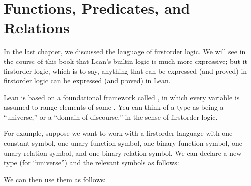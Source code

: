 \documentclass[letterpaper,10pt,english]{sphinxmanual}
\begin{document}
\section{Functions, Predicates, and Relations}
\label{\detokenize{first_order_logic_in_lean:functions-predicates-and-relations}}
\sphinxAtStartPar
In the last chapter, we discussed the language of first\sphinxhyphen{}order logic. We will see in the course of this book that Lean’s built\sphinxhyphen{}in logic is much more expressive; but it  first\sphinxhyphen{}order logic, which is to say, anything that can be expressed (and proved) in first\sphinxhyphen{}order logic can be expressed (and proved) in Lean.

\sphinxAtStartPar
Lean is based on a foundational framework called , in which every variable is assumed to range elements of some . You can think of a type as being a “universe,” or a “domain of discourse,” in the sense of first\sphinxhyphen{}order logic.

\sphinxAtStartPar
For example, suppose we want to work with a first\sphinxhyphen{}order language with one constant symbol, one unary function symbol, one binary function symbol, one unary relation symbol, and one binary relation symbol. We can declare a new type  (for “universe”) and the relevant symbols as follows:

\begin{sphinxVerbatim}[commandchars=\\\{\}]
   

   
     
       
     
       
\end{sphinxVerbatim}

\sphinxAtStartPar
We can then use them as follows:

\begin{sphinxVerbatim}[commandchars=\\\{\}]
    

 
  
   
    

     
   
\end{sphinxVerbatim}
\end{document}
